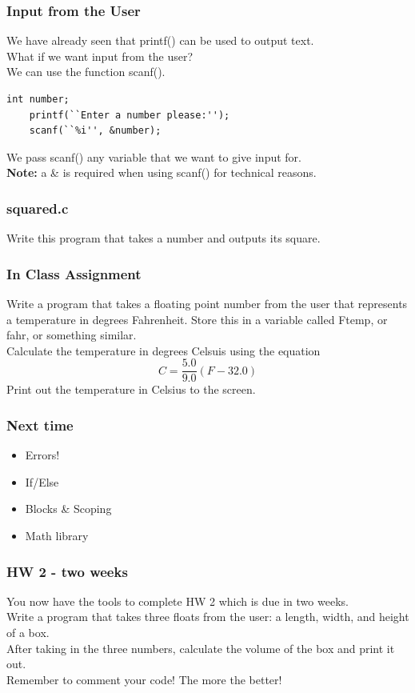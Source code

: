 \documentclass{beamer}
\begin{document}
\begin{frame}[fragile]
  \frametitle{Input from the User}
  We have already seen that printf() can be used to output text.\\
  What if we want input from the user?\\
  We can use the function scanf().
  \begin{lstlisting}[style=customc]
    int number;
    printf(``Enter a number please:'');
    scanf(``%i'', &number);
  \end{lstlisting}
  We pass scanf() any variable that we want to give input for.\\
  \textbf{Note:} a \& is required when using scanf() for technical reasons.
\end{frame}

\begin{frame}
  \frametitle{squared.c}
  Write this program that takes a number and outputs its square.
  
\end{frame}

\begin{frame}[fragile]
  \frametitle{In Class Assignment}
  Write a program that takes a floating point number from the user that represents
  a temperature in degrees Fahrenheit. Store this in a variable called Ftemp, or 
  fahr, or something similar.\\
  Calculate the temperature in degrees Celsuis using the equation
  \begin{equation*}
    C = \frac{5.0}{9.0}(F-32.0)
  \end{equation*}
  Print out the temperature in Celsius to the screen.
\end{frame}

\begin{frame}
  \frametitle{Next time}
  \begin{itemize}
    \item Errors!
    \item If/Else
    \item Blocks \& Scoping
    \item Math library
  \end{itemize}
\end{frame}

\begin{frame}
  \frametitle{HW 2 - two weeks}
  You now have the tools to complete HW 2 which is due in two weeks.\\
  \vspace{12pt}
  Write a program that takes three floats from the user: a length, width, and height of a box.\\
  After taking in the three numbers, calculate the volume of the box and print it out.\\
  Remember to comment your code! The more the better!
\end{frame}
\end{document}
